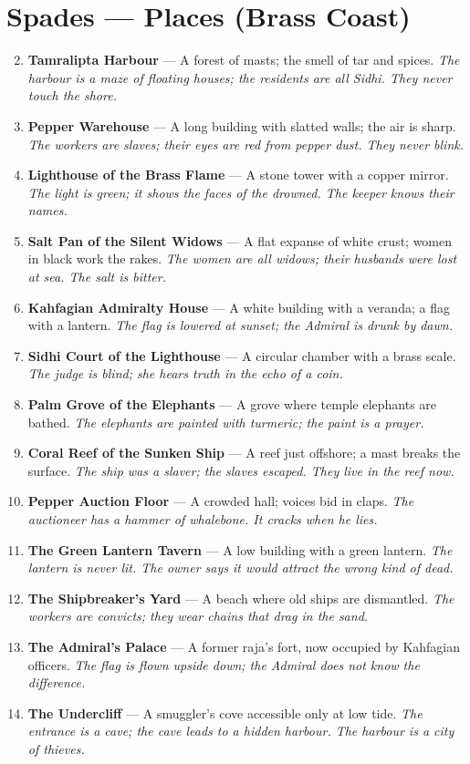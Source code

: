 \documentclass[11pt]{book}
\begin{document}
\section*{Spades — Places (Brass Coast)}
\begin{enumerate}
\setcounter{enumi}{1}
\item \textbf{Tamralipta Harbour} — A forest of masts; the smell of tar and spices. \textit{The harbour is a maze of floating houses; the residents are all Sidhi. They never touch the shore.}
\item \textbf{Pepper Warehouse} — A long building with slatted walls; the air is sharp. \textit{The workers are slaves; their eyes are red from pepper dust. They never blink.}
\item \textbf{Lighthouse of the Brass Flame} — A stone tower with a copper mirror. \textit{The light is green; it shows the faces of the drowned. The keeper knows their names.}
\item \textbf{Salt Pan of the Silent Widows} — A flat expanse of white crust; women in black work the rakes. \textit{The women are all widows; their husbands were lost at sea. The salt is bitter.}
\item \textbf{Kahfagian Admiralty House} — A white building with a veranda; a flag with a lantern. \textit{The flag is lowered at sunset; the Admiral is drunk by dawn.}
\item \textbf{Sidhi Court of the Lighthouse} — A circular chamber with a brass scale. \textit{The judge is blind; she hears truth in the echo of a coin.}
\item \textbf{Palm Grove of the Elephants} — A grove where temple elephants are bathed. \textit{The elephants are painted with turmeric; the paint is a prayer.}
\item \textbf{Coral Reef of the Sunken Ship} — A reef just offshore; a mast breaks the surface. \textit{The ship was a slaver; the slaves escaped. They live in the reef now.}
\item \textbf{Pepper Auction Floor} — A crowded hall; voices bid in claps. \textit{The auctioneer has a hammer of whalebone. It cracks when he lies.}
\item[J] \textbf{The Green Lantern Tavern} — A low building with a green lantern. \textit{The lantern is never lit. The owner says it would attract the wrong kind of dead.}
\item[Q] \textbf{The Shipbreaker’s Yard} — A beach where old ships are dismantled. \textit{The workers are convicts; they wear chains that drag in the sand.}
\item[K] \textbf{The Admiral’s Palace} — A former raja’s fort, now occupied by Kahfagian officers. \textit{The flag is flown upside down; the Admiral does not know the difference.}
\item[A] \textbf{The Undercliff} — A smuggler’s cove accessible only at low tide. \textit{The entrance is a cave; the cave leads to a hidden harbour. The harbour is a city of thieves.}
\end{enumerate}
\end{document}

